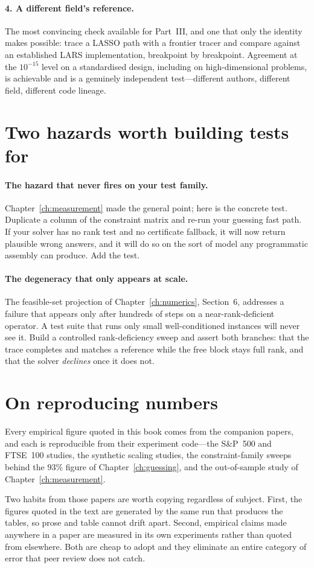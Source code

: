 \paragraph{4. A different field's reference.} The most convincing check available for
Part~III, and one that only the identity makes possible: trace a LASSO path with a
frontier tracer and compare against an established LARS implementation, breakpoint by
breakpoint. Agreement at the $10^{-15}$ level on a standardised design, including on
high-dimensional problems, is achievable and is a genuinely independent test---different
authors, different field, different code lineage.

\section{Two hazards worth building tests for}

\paragraph{The hazard that never fires on your test family.} Chapter~\ref{ch:measurement}
made the general point; here is the concrete test. Duplicate a column of the constraint
matrix and re-run your guessing fast path. If your solver has no rank test and no
certificate fallback, it will now return plausible wrong answers, and it will do so on
the sort of model any programmatic assembly can produce. Add the test.

\paragraph{The degeneracy that only appears at scale.} The feasible-set projection of
Chapter~\ref{ch:numerics}, Section~6, addresses a failure that appears only after
hundreds of steps on a near-rank-deficient operator. A test suite that runs only small
well-conditioned instances will never see it. Build a controlled rank-deficiency sweep
and assert both branches: that the trace completes and matches a reference while the free
block stays full rank, and that the solver \emph{declines} once it does not.

\section{On reproducing numbers}

Every empirical figure quoted in this book comes from the companion papers, and each is
reproducible from their experiment code---the S\&P~500 and FTSE~100 studies, the
synthetic scaling studies, the constraint-family sweeps behind the $93\%$ figure of
Chapter~\ref{ch:guessing}, and the out-of-sample study of Chapter~\ref{ch:measurement}.

Two habits from those papers are worth copying regardless of subject. First, the figures
quoted in the text are generated by the same run that produces the tables, so prose and
table cannot drift apart. Second, empirical claims made anywhere in a paper are measured
in its own experiments rather than quoted from elsewhere. Both are cheap to adopt and
they eliminate an entire category of error that peer review does not catch.

